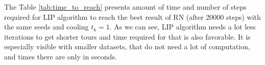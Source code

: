 	
	
	The Table \ref{tab:time_to_reach} presents amount of time and number of steps required for LIP algorithm to reach the best result of RN (after 20000 steps) with the same seeds and cooling $t_k=1$. As we can see, LIP algorithm needs a lot less iterations to get shorter tours and time required for that is also favorable. It is especially visible with smaller datasets, that do not need a lot of computation, and times there are only in seconds.